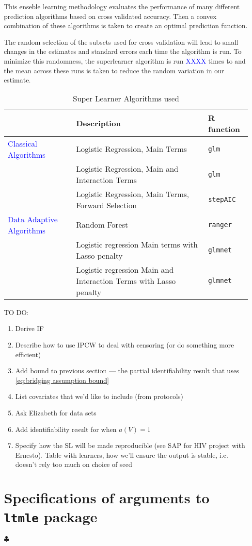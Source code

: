 \documentclass[12pt]{article}
\theoremstyle{definition}
\begin{document}
This enseble learning methodology evaluates the performance of many different prediction algorithms based on cross validated accuracy.  Then a convex combination of these algorithms is taken to create an optimal prediction function.  

The random selection of the subsets used for cross validation will lead to small changes in the estimates and standard errors each time the algorithm is run.  To minimize this randomness, the superlearner algorithm is run \textcolor{blue}{XXXX} times to and the mean across these runs is taken to reduce the random variation in our estimate.

\begin{table}
    \caption{Super Learner Algorithms used}
\centering
    \label{tab:SL_library}
    \begin{tabular}{lm{9.5cm}l}
        \toprule
       & Description & R function \\
       \midrule
\textcolor{blue}{Classical Algorithms} & Logistic Regression, Main Terms & \texttt{glm}\\
& Logistic Regression, Main and Interaction Terms & \texttt{glm}\\
& Logistic Regression, Main Terms, Forward Selection & \texttt{stepAIC}\\
\addlinespace
\textcolor{blue}{Data Adaptive Algorithms} & Random Forest & \texttt{ranger}\\
& Logistic regression Main terms with Lasso penalty & \texttt{glmnet}\\
& Logistic regression Main and Interaction Terms with Lasso penalty & \texttt{glmnet}\\
\bottomrule
    \end{tabular}
\end{table}

TO DO:
\begin{enumerate}
    \item Derive IF
    \item Describe how to use IPCW to deal with censoring (or do something more efficient)
    \item Add bound to previous section --- the partial identifiability result that uses \eqref{eq:bridging assumption bound}
    \item List covariates that we'd like to include (from protocols)
    \item Ask Elizabeth for data sets
    \item Add identifiability result for when $a(V)=1$
    \item Specify how the SL will be made reproducible (see SAP for HIV project with Ernesto). Table with learners, how we'll ensure the output is stable, i.e. doesn't rely too much on choice of seed
\end{enumerate}

\newpage
\appendix
\section{Specifications of arguments to \texttt{ltmle} package}
$\clubsuit$
\end{document}
